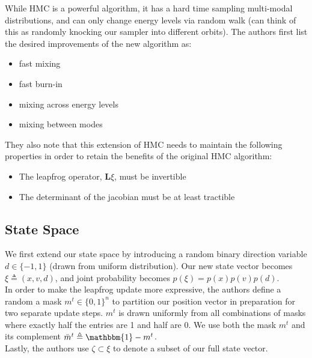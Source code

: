 \documentclass[twoside]{article}
\begin{document}
While HMC is a powerful algorithm, it has a hard time sampling multi-modal distributions, and can only change energy levels via random walk (can think of this as randomly knocking our sampler into different orbits). The authors first list the desired improvements of the new algorithm as:
\begin{itemize}
    \item fast mixing
    \item fast burn-in
    \item mixing across energy levels
    \item mixing between modes
\end{itemize}
They also note that this extension of HMC needs to maintain the following properties in order to retain the benefits of the original HMC algorithm:
\begin{itemize}
    \item The leapfrog operator, $\textbf{L}\xi$, must be invertible
    \item The determinant of the jacobian must be at least tractible
\end{itemize}

\subsection{State Space}
We first extend our state space by introducing a random binary direction variable $d\in \{-1,1\}$ (drawn from uniform distribution). Our new state vector becomes $\xi \triangleq (x,v,d)$, and joint probability becomes $p(\xi)=p(x)p(v)p(d)$. 
\\In order to make the leapfrog update more expressive, the authors define a random a mask $m^t \in \{0,1\}^n$ to partition our position vector in preparation for two separate update steps. $m^t$ is drawn uniformly from all combinations of masks where exactly half the entries are 1 and half are 0. We use both the mask  $m^t$ and its complement $\Bar{m}^t \triangleq \mathbbm{1}-m^t$. 
\\Lastly, the authors use $\zeta \subset \xi$ to denote a subset of our full state vector.
\end{document}
